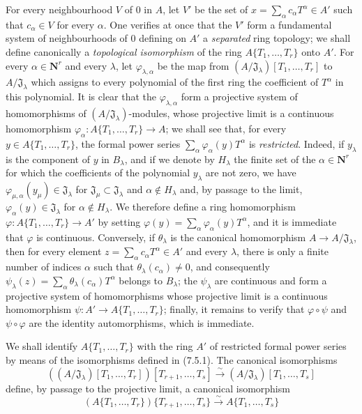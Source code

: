 \begin{env}[7.5.1]
For every neighbourhood $V$ of $0$ in $A$, let $V'$ be the set of
$x=\sum_\alpha c_\alpha T^\alpha\in A'$ such that $c_\alpha\in V$ for every
$\alpha$. One verifies at once that the $V'$ form a fundamental system of
neighbourhoods of $0$ defining on $A'$ a \emph{separated} ring topology;
we shall define canonically a \emph{topological isomorphism} of
the ring $A\{T_1,\ldots,T_r\}$ onto $A'$. For every
$\alpha\in\mathbf{N}^r$ and every $\lambda$, let
$\varphi_{\lambda,\alpha}$ be the map from
$(A/\mathfrak J_\lambda)[T_1,\ldots,T_r]$ to
$A/\mathfrak J_\lambda$ which assigns to every polynomial of the first ring
the coefficient of $T^\alpha$ in this polynomial. It is clear that
the $\varphi_{\lambda,\alpha}$ form a projective system of homomorphisms
of $(A/\mathfrak J_\lambda)$-modules, whose projective limit is a
continuous homomorphism
$\varphi_\alpha:A\{T_1,\ldots,T_r\}\to A$; we shall see that, for every
$y\in A\{T_1,\ldots,T_r\}$, the formal power series
$\sum_\alpha\varphi_\alpha(y)T^\alpha$ is \emph{restricted}. Indeed, if
$y_\lambda$ is the component of $y$ in $B_\lambda$, and if we denote by
$H_\lambda$ the finite set of the $\alpha\in\mathbf{N}^r$ for which the
coefficients of the polynomial $y_\lambda$ are not zero, we have
$\varphi_{\mu,\alpha}(y_\mu)\in\mathfrak J_\lambda$ for
$\mathfrak J_\mu\subset\mathfrak J_\lambda$ and $\alpha\notin H_\lambda$ and,
by passage to the limit, $\varphi_\alpha(y)\in\mathfrak J_\lambda$ for
$\alpha\notin H_\lambda$. We therefore define a ring homomorphism
$\varphi:A\{T_1,\ldots,T_r\}\to A'$ by setting
$\varphi(y)=\sum_\alpha\varphi_\alpha(y)T^\alpha$, and it is immediate that
$\varphi$ is continuous. Conversely, if $\theta_\lambda$ is the canonical
homomorphism $A\to A/\mathfrak J_\lambda$, then for every element
$z=\sum_\alpha c_\alpha T^\alpha\in A'$ and every $\lambda$, there is only a
finite number of indices $\alpha$ such that $\theta_\lambda(c_\alpha)\neq0$, and
consequently
$\psi_\lambda(z)=\sum_\alpha\theta_\lambda(c_\alpha)T^\alpha$ belongs to
$B_\lambda$; the $\psi_\lambda$ are continuous and form a projective
system of homomorphisms whose projective limit is a continuous
homomorphism $\psi:A'\to A\{T_1,\ldots,T_r\}$; finally, it remains to verify that
$\varphi\circ\psi$ and $\psi\circ\varphi$ are the identity automorphisms,
which is immediate.
\end{env}

\begin{env}[7.5.2]
\label{0.7.5.2}
We shall identify $A\{T_1,\ldots,T_r\}$ with the ring $A'$ of restricted formal
power series by means of the isomorphisms defined in (7.5.1). The canonical
isomorphisms
\[
  ((A/\mathfrak J_\lambda)[T_1,\ldots,T_r])
  [T_{r+1},\ldots,T_s]
  \xrightarrow{\sim}
  (A/\mathfrak J_\lambda)[T_1,\ldots,T_s]
\]
define, by passage to the projective limit, a canonical isomorphism
\[
  (A\{T_1,\ldots,T_r\})\{T_{r+1},\ldots,T_s\}
  \xrightarrow{\sim}
  A\{T_1,\ldots,T_s\}
\]
\end{env}

